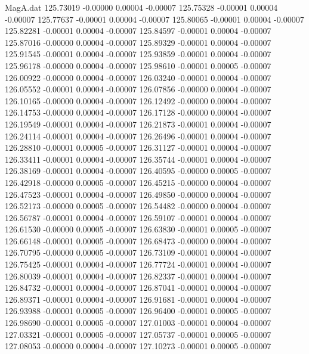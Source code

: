 \begin{filecontents}{MagA.dat}
 125.73019   -0.00000    0.00004   -0.00007
 125.75328   -0.00001    0.00004   -0.00007
 125.77637   -0.00001    0.00004   -0.00007
 125.80065   -0.00001    0.00004   -0.00007
 125.82281   -0.00001    0.00004   -0.00007
 125.84597   -0.00001    0.00004   -0.00007
 125.87016   -0.00000    0.00004   -0.00007
 125.89329   -0.00001    0.00004   -0.00007
 125.91545   -0.00001    0.00004   -0.00007
 125.93859   -0.00001    0.00004   -0.00007
 125.96178   -0.00000    0.00004   -0.00007
 125.98610   -0.00001    0.00005   -0.00007
 126.00922   -0.00000    0.00004   -0.00007
 126.03240   -0.00001    0.00004   -0.00007
 126.05552   -0.00001    0.00004   -0.00007
 126.07856   -0.00000    0.00004   -0.00007
 126.10165   -0.00000    0.00004   -0.00007
 126.12492   -0.00000    0.00004   -0.00007
 126.14753   -0.00000    0.00004   -0.00007
 126.17128   -0.00000    0.00004   -0.00007
 126.19549   -0.00001    0.00004   -0.00007
 126.21873   -0.00001    0.00004   -0.00007
 126.24114   -0.00001    0.00004   -0.00007
 126.26496   -0.00001    0.00004   -0.00007
 126.28810   -0.00001    0.00005   -0.00007
 126.31127   -0.00001    0.00004   -0.00007
 126.33411   -0.00001    0.00004   -0.00007
 126.35744   -0.00001    0.00004   -0.00007
 126.38169   -0.00001    0.00004   -0.00007
 126.40595   -0.00000    0.00005   -0.00007
 126.42918   -0.00000    0.00005   -0.00007
 126.45215   -0.00000    0.00004   -0.00007
 126.47523   -0.00001    0.00004   -0.00007
 126.49850   -0.00000    0.00004   -0.00007
 126.52173   -0.00000    0.00005   -0.00007
 126.54482   -0.00000    0.00004   -0.00007
 126.56787   -0.00001    0.00004   -0.00007
 126.59107   -0.00001    0.00004   -0.00007
 126.61530   -0.00000    0.00005   -0.00007
 126.63830   -0.00001    0.00005   -0.00007
 126.66148   -0.00001    0.00005   -0.00007
 126.68473   -0.00000    0.00004   -0.00007
 126.70795   -0.00000    0.00005   -0.00007
 126.73109   -0.00001    0.00004   -0.00007
 126.75425   -0.00001    0.00004   -0.00007
 126.77724   -0.00001    0.00004   -0.00007
 126.80039   -0.00001    0.00004   -0.00007
 126.82337   -0.00001    0.00004   -0.00007
 126.84732   -0.00001    0.00004   -0.00007
 126.87041   -0.00001    0.00004   -0.00007
 126.89371   -0.00001    0.00004   -0.00007
 126.91681   -0.00001    0.00004   -0.00007
 126.93988   -0.00001    0.00005   -0.00007
 126.96400   -0.00001    0.00005   -0.00007
 126.98690   -0.00001    0.00005   -0.00007
 127.01003   -0.00001    0.00004   -0.00007
 127.03321   -0.00001    0.00005   -0.00007
 127.05737   -0.00001    0.00005   -0.00007
 127.08053   -0.00000    0.00004   -0.00007
 127.10273   -0.00001    0.00005   -0.00007

\end{filecontents}
